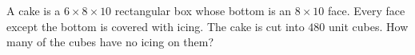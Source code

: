 A cake is a $6\times8\times10$ rectangular box whose bottom is an $8\times10$ face. Every face except the bottom is covered with icing. The cake is cut into $480$ unit cubes. How many of the cubes have no icing on them?
